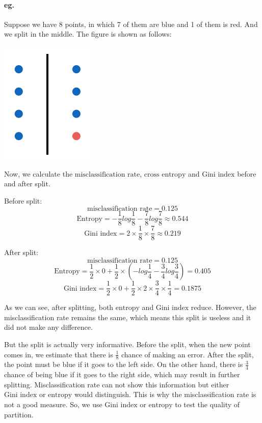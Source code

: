 \documentclass{article}
\begin{document}
\paragraph{eg.}{
Suppose we have 8 points, in which 7 of them are blue and 1 of them is red. And we split in the middle. The figure is shown as follows:
 \begin{center}
 	\includegraphics[scale=0.65]{images/split.png}
 \end{center}  

Now, we calculate the $\text{misclassification rate}$, $\text{cross entropy}$ and $\text{Gini index}$ before and after split.

Before split:\[\text{misclassification rate}=0.125\]
\[\text{Entropy}=-\frac{1}{8}\mathit{log}\frac{1}{8}-\frac{7}{8}\mathit{log}\frac{7}{8}\approx0.544\]
\[\text{Gini index}=2\times\frac{1}{8}\times\frac{7}{8}\approx0.219\]

After split:\[\text{misclassification rate}=0.125\]
\[\text{Entropy}=\frac{1}{2}\times0+\frac{1}{2}\times(-\mathit{log}\frac{1}{4}-\frac{3}{4}\mathit{log}\frac{3}{4})=0.405\] 
\[\text{Gini index}=\frac{1}{2}\times0+\frac{1}{2}\times2\times\frac{3}{4}\times\frac{1}{4}=0.1875\]

As we can see, after splitting, both $\text{entropy}$ and $\text{Gini index}$ reduce. However, the misclassification rate remains the same, which means this split is useless and it did not make any difference. 

But the split is actually very informative. Before the split, when the new point comes in, we estimate that there is $\frac{1}{8}$ chance of making an error. After the split, the point must be blue if it goes to the left side. On the other hand, there is $\frac{3}{4}$ chance of being blue if it goes to the right side, which may result in further splitting. Misclassification rate can not show this information but either $\text{Gini index}$ or $\text{entropy}$ would distinguish. This is why the misclassification rate is not a good measure. So, we use $\text{Gini index}$ or $\text{entropy}$ to test the quality of partition.

}
\end{document}
